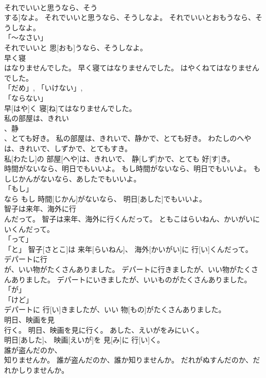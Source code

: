 \documentclass[8pt]{extreport}
\begin{document}
\begin{CJK}{UTF8}{min}
\\	それでいいと思うなら、そう
\\	する]なよ。	それでいいと思うなら、そうしなよ。	それでいいとおもうなら、そうしなよ。	
\\	「～なさい」 
\\	それでいいと 思[おも]うなら、そうしなよ。		
\\	早く寝
\\	はなりませんでした。	早く寝てはなりませんでした。	はやくねてはなりませんでした。	
\\	「だめ」, 「いけない」, 
\\	「ならない」 
\\	早[はや]く 寝[ね]てはなりませんでした。		
\\	私の部屋は、きれい
\\	、静
\\	、とても好き。	私の部屋は、きれいで、静かで、とても好き。	わたしのへやは、きれいで、しずかで、とてもすき。	
\\	私[わたし]の 部屋[へや]は、きれいで、 静[しず]かで、とても 好[す]き。		
\\	時間がないなら、明日でもいいよ。	もし時間がないなら、明日でもいいよ。	もしじかんがないなら、あしたでもいいよ。	
\\	「もし」 
\\	なら	もし 時間[じかん]がないなら、 明日[あした]でもいいよ。		
\\	智子は来年、海外に行
\\	んだって。	智子は来年、海外に行くんだって。	ともこはらいねん、かいがいにいくんだって。	
\\	「って」 
\\	「と」	智子[さとこ]は 来年[らいねん]、 海外[かいがい]に 行[い]くんだって。		
\\	デパートに行
\\	が、いい物がたくさんありました。	デパートに行きましたが、いい物がたくさんありました。	デパートにいきましたが、いいものがたくさんありました。	
\\	「が」 
\\	「けど」
\\	デパートに 行[い]きましたが、いい 物[もの]がたくさんありました。		
\\	明日、映画を見
\\	行く。	明日、映画を見に行く。	あした、えいがをみにいく。	
\\	明日[あした]、 映画[えいが]を 見[み]に 行[い]く。		
\\	誰が盗んだのか、
\\	知りませんか。	誰が盗んだのか、誰か知りませんか。	だれがぬすんだのか、だれかしりませんか。	

\end{CJK}
\end{document}

